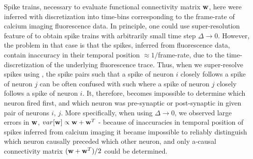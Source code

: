 

Spike trains, necessary to evaluate functional connectivity matrix $\mathbf{w}$, here were inferred with discretization into time-bins corresponding to the frame-rate of calcium imaging fluorescence data. In principle, one could use super-resolution feature of \cite{Vogelstein2009} to obtain spike trains with arbitrarily small time step $\Delta\rightarrow 0$. However, the problem in that case is that the spikes, inferred from fluorescence data, contain inaccuracy in their temporal position $\approx 1/$frame-rate,  due to the time-discretization of the underlying fluorescence trace.
Thus, when we super-resolve spikes using \cite{Vogelstein2009}, the spike pairs such that a spike of neuron $i$ closely follows a spike of neuron $j$ can be often confused with such where a spike of neuron $j$ closely follows a spike of neuron $i$.
It, therefore, becomes impossible to determine which neuron fired first, and which neuron
was pre-synaptic or post-synaptic in given pair of neurons $i$, $j$.
More specifically, 
when using $\Delta \rightarrow 0$, we observed large errors in $\mathbf{w}$,
$var[\mathbf{w}] \propto \mathbf{w} + \mathbf{w}^T$ - because of inaccuracies in temporal position of spikes inferred from calcium imaging it became impossible to reliably distinguish which neuron causally preceded which other neuron, and only a-causal connectivity matrix $(\mathbf{w} + \mathbf{w}^T)/2$ could be determined.

